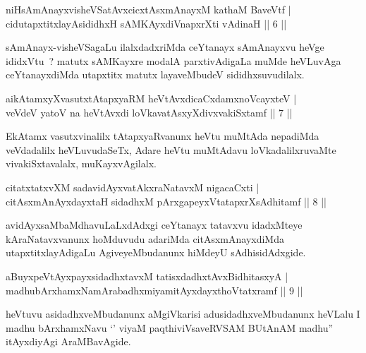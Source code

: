 \begin{shl}
niHsAmAnayxvisheVSatAvxcicxtAsxmAnayxM kathaM BaveVtf |\\
cidutapxtitxlayAsididhxH sAMKAyxdiVnapxrXti vAdinaH \hfill || 6 ||
\end{shl}

\begin{artha}
sAmAnayx-visheVSagaLu ilalxdadxriMda ceYtanayx sAmAnayxvu heVge ididxVtu~? matutx sAMKayxre modalA parxtivAdigaLa muMde heVLuvAga ceYtanayxdiMda utapxtitx matutx layaveMbudeV sididhxsuvudilalx.
\end{artha}

\begin{shl}
aikAtamxyXvasutxtAtapxyaRM heVtAvxdicaCxdamxnoVcayxteV |\\
veVdeV yatoV na heVtAvxdi loVkavatAsxyXdivxvakiSxtamf \hfill || 7 ||
\end{shl}

\begin{artha}
EkAtamx vasutxvinalilx tAtapxyaRvanunx heVtu muMtAda nepadiMda veVdadalilx heVLuvudaSeTx, Adare heVtu muMtAdavu loVkadalilxruvaMte vivakiSxtavalalx, muKayxvAgilalx.
\end{artha}

\begin{shl}
citatxtatxvXM sadavidAyxvatAkxraNatavxM nigacaCxti |\\
citAsxmAnAyxdayxtaH sidadhxM pArxgapeyxVtatapxrXsAdhitamf \hfill || 8 ||
\end{shl}

\begin{artha}
avidAyxsaMbaMdhavuLaLxdAdxgi ceYtanayx tatavxvu idadxMteye kAraNatavxvanunx hoMduvudu adariMda citAsxmAnayxdiMda utapxtitxlayAdigaLu AgiveyeMbudanunx hiMdeyU sAdhisidAdxgide.
\end{artha}


\begin{shl}
aBuyxpeVtAyxpayxsidadhxtavxM tatisxdadhxtAvxBidhitasxyA |\\
madhubArxhamxNamArabadhxmiyamitAyxdayxthoVtatxramf \hfill || 9 ||
\end{shl}

\begin{artha}
heVtuvu asidadhxveMbudanunx aMgiVkarisi adusidadhxveMbudanunx heVLalu I madhu bArxhamxNavu `' viyaM paqthiviVsaveRVSAM BUtAnAM madhu'' itAyxdiyAgi AraMBavAgide.
\end{artha}

